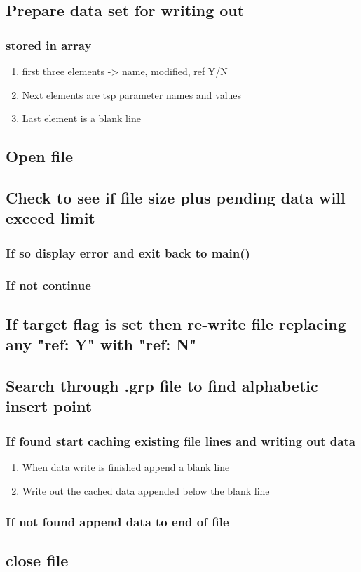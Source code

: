 \documentclass[11pt]{article}
\begin{document}
\subsection{Prepare data set for writing out}
\label{sec-1-5}
\subsubsection{stored in array}
\label{sec-1-5-1}
\begin{enumerate}
\item first three elements -> name, modified, ref Y/N
\label{sec-1-5-1-1}
\item Next elements are tsp parameter names and values
\label{sec-1-5-1-2}
\item Last element is a blank line
\label{sec-1-5-1-3}
\end{enumerate}
\subsection{Open file}
\label{sec-1-6}
\subsection{Check to see if file size plus pending data will exceed limit}
\label{sec-1-7}
\subsubsection{If so display error and exit back to main()}
\label{sec-1-7-1}
\subsubsection{If not continue}
\label{sec-1-7-2}
\subsection{If target flag is set then re-write file replacing any "ref: Y" with "ref: N"}
\label{sec-1-8}
\subsection{Search through .grp file to find alphabetic insert point}
\label{sec-1-9}
\subsubsection{If found start caching existing file lines and writing out data}
\label{sec-1-9-1}
\begin{enumerate}
\item When data write is finished append a blank line
\label{sec-1-9-1-1}
\item Write out the cached data appended below the blank line
\label{sec-1-9-1-2}
\end{enumerate}
\subsubsection{If not found append data to end of file}
\label{sec-1-9-2}
\subsection{close file}
\label{sec-1-10}
\end{document}
